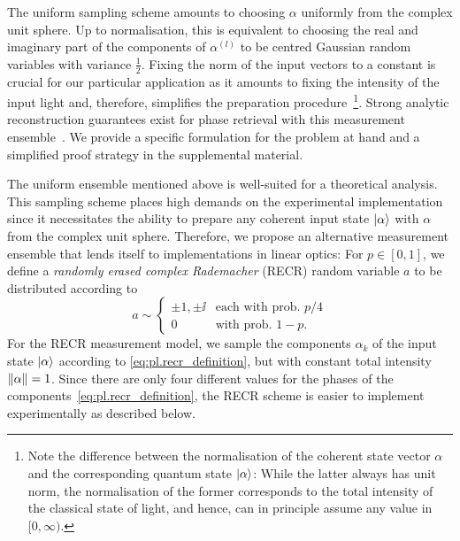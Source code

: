 The uniform sampling scheme amounts to choosing $ \alpha$ uniformly from the complex unit sphere.
Up to normalisation, this is equivalent to choosing the real and imaginary part of the components of $\alpha^{(l)}$ to be centred Gaussian random variables with variance $\tfrac{1}{2}$.
Fixing the norm of the input vectors to a constant is crucial for our particular application as it amounts to fixing the intensity of the input light and, therefore, simplifies the preparation procedure~\footnote{%
  Note the difference between the normalisation of the coherent state vector $\alpha$ and the corresponding quantum state ${|{\alpha}\rangle}$:
  While the latter always has unit norm, the normalisation of the former corresponds to the total intensity of the classical state of light, and hence, can in principle assume any value in $[0,\infty)$.
}.
Strong analytic reconstruction guarantees exist for phase retrieval with this measurement ensemble~\cite{Candes_2012_Solving,Tropp_2014_Convex,Kueng_2014_Low}.
We provide a specific formulation for the problem at hand and a simplified proof strategy in the supplemental material.

The uniform ensemble mentioned above is well-suited for a theoretical analysis.
This sampling scheme places high demands on the experimental implementation since it necessitates the ability to prepare any coherent input state $\ket{ \alpha}$ with $\alpha$ from the complex unit sphere.
Therefore, we propose an alternative measurement ensemble that lends itself to implementations in linear optics:
For $p \in [0,1]$, we define a \emph{randomly erased complex Rademacher} (RECR) random variable $a$ to be distributed according to
\[
  a \sim
  \begin{cases}
    \pm 1, \pm \ii & \textrm{each with prob. } p/4 \\
    0 & \textrm{with prob. } 1 - p.
  \end{cases}
  \label{eq:pl.recr_definition}
\]
For the RECR measurement model, we sample the components $\alpha_k$ of the input state $\ket{ \alpha}$ according to \cref{eq:pl.recr_definition}, but with constant total intensity ${\Vert\alpha\Vert} = 1$.
Since there are only four different values for the phases of the components~\eqref{eq:pl.recr_definition}, the RECR scheme is easier to implement experimentally as described below.

